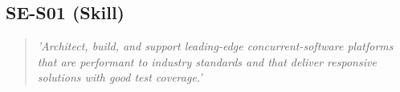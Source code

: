 \subsection{SE-S01 (Skill)}

  \begin{quote}
    \textit{'Architect, build, and support leading-edge
    concurrent-software platforms that are performant to
    industry standards and that deliver responsive solutions
    with good test coverage.'}
  \end{quote}

\newpage